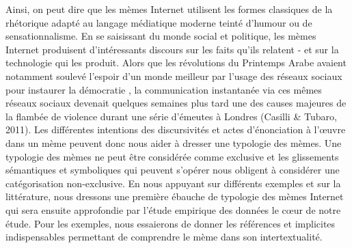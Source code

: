 Ainsi, on peut dire que les m\`emes Internet utilisent les formes
classiques de la rh\'etorique adapt\'e au langage m\'ediatique moderne
teint\'e d{\textquoteright}humour ou de sensationnalisme. En se
saisissant du monde social et politique, les m\`emes Internet
produisent d{\textquoteright}int\'eressants discours sur les faits
qu{\textquoteright}ils relatent - et sur la technologie qui les
produit. Alors que les r\'evolutions du Printemps Arabe avaient
notamment soulev\'e l{\textquoteright}espoir d{\textquoteright}un monde
meilleur par l{\textquoteright}usage des r\'eseaux sociaux pour
instaurer la d\'emocratie \citep{Lotan2011}, la communication
instantan\'ee via ces m\^emes r\'eseaux sociaux devenait quelques
semaines plus tard une des causes majeures de la flamb\'ee de violence
durant une s\'erie d{\textquoteright}\'emeutes \`a Londres (Casilli \&
Tubaro, 2011). Les diff\'erentes intentions des discursivit\'es et
actes d{\textquoteright}\'enonciation \`a l{\textquoteright}{\oe}uvre
dans un m\`eme peuvent donc nous aider \`a dresser une typologie des
m\`emes. Une typologie des m\`emes ne peut \^etre consid\'er\'ee comme
exclusive et les glissements s\'emantiques et symboliques qui peuvent
s{\textquoteright}op\'erer nous obligent \`a consid\'erer une
cat\'egorisation non-exclusive. En nous appuyant sur diff\'erents
exemples et sur la litt\'erature, nous dressons une premi\`ere
\'ebauche de typologie des m\`emes Internet qui sera ensuite
approfondie par l{\textquoteright}\'etude empirique des donn\'ees le
c{\oe}ur de notre \'etude. Pour les exemples, nous essaierons de donner
les r\'ef\'erences et implicites indispensables permettant de
comprendre le m\`eme dans son intertextualit\'e.

